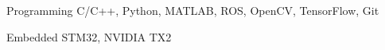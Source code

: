 

\begin{cvskills}

  \cvskill
    {Programming} %
    {C/C++, Python, MATLAB, ROS, OpenCV, TensorFlow, Git} %

  \cvskill
    {Embedded} %
    {STM32, NVIDIA TX2} %

\end{cvskills}
